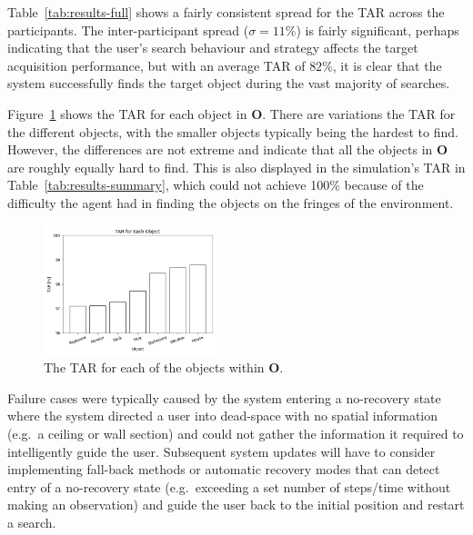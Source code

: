 \documentclass[a4paper, twoside]{article}
\begin{document}

Table~\ref{tab:results-full} shows a fairly consistent spread for the TAR across the participants. The inter-participant spread ($\sigma=11\%$) is fairly significant, perhaps indicating that the user's search behaviour and strategy affects the target acquisition performance, but with an average TAR of $82\%$, it is clear that the system successfully finds the target object during the vast majority of searches. 

Figure~\ref{fig:tar-objects} shows the TAR for each object in $\mathbf{O}$. There are variations the TAR for the different objects, with the smaller objects typically being the hardest to find. However, the differences are not extreme and indicate that all the objects in $\mathbf{O}$ are roughly equally hard to find. This is also displayed in the simulation's TAR in Table~\ref{tab:results-summary}, which could not achieve 100\% because of the difficulty the agent had in finding the objects on the fringes of the environment. 

\begin{figure}
  \centering
  \includegraphics[width=0.45\textwidth]{../figures/tar_objects.png}
  \caption{The TAR for each of the objects within $\mathbf{O}$. }\label{fig:tar-objects}
\end{figure}

Failure cases were typically caused by the system entering a no-recovery state where the system directed a user into dead-space with no spatial information (e.g.\ a ceiling or wall section) and could not gather the information it required to intelligently guide the user. Subsequent system updates will have to consider implementing fall-back methods or automatic recovery modes that can detect entry of a no-recovery state (e.g.\ exceeding a set number of steps/time without making an observation) and guide the user back to the initial position and restart a search.
\end{document}
